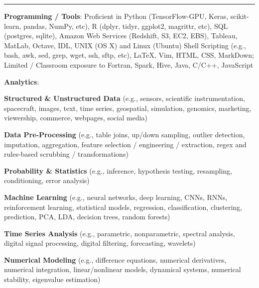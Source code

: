 \documentclass[10pt]{article}
\newcommand{\ressection}[1]{\noindent{\large\textbf{#1}}
\vspace{2pt}\hrule\vspace{4pt}}
\begin{document}


\vspace{0.5cm}
\ressection{Computing Skills}
\noindent\textbf{Programming / Tools}: Proficient in Python  
(TensorFlow-GPU, Keras, scikit-learn, pandas, NumPy, etc), R (dplyr, tidyr,
ggplot2, magrittr, etc), SQL (postgres, sqlite),
Amazon Web Services (Redshift, S3, EC2, EBS), Tableau, MatLab, Octave, IDL, 
UNIX (OS X) and Linux (Ubuntu) Shell Scripting (e.g., bash, awk, sed,
grep, wget, ssh, sftp, etc), 
LaTeX, Vim, HTML, CSS, MarkDown; Limited / Classroom
exposure to Fortran, Spark, Hive, Java, C/C++, JavaScript
  \vspace{0.1in}

\noindent\textbf{Analytics}:
\vspace{-0.2cm}
\begin{itemize*}
  \item \textbf{Structured \& Unstructured Data} (e.g., sensors,
    scientific instrumentation, spacecraft, 
    images, text, time series, geospatial, simulation, 
    genomics, marketing, viewership, commerce, webpages, social media)
  \item \textbf{Data Pre-Processing} (e.g., table joins, up/down sampling, outlier detection, 
    imputation, aggregation, feature selection / engineering /
    extraction, regex and rules-based scrubbing / transformations)
  \item \textbf{Probability \& Statistics} (e.g., inference,
    hypothesis testing, resampling, conditioning, error analysis)
  \item \textbf{Machine Learning} (e.g., neural networks,
    deep learning, CNNs, RNNs, reinforcement learning, statistical
    models, regression, classification, clustering, prediction,
    PCA, LDA, decision trees, random forests)
  \item \textbf{Time Series Analysis} (e.g., parametric, nonparametric, spectral
    analysis, digital signal processing, digital filtering, forecasting,
    wavelets)
  \item \textbf{Numerical Modeling}
    (e.g., difference equations, numerical derivatives, numerical
    integration, linear/nonlinear models, dynamical systems, numerical stability, 
    eigenvalue estimation)
\end{itemize*}
\end{document}

